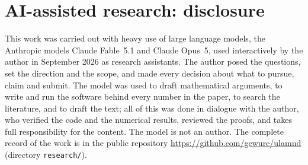 \documentclass[11pt,a4paper]{article}
\theoremstyle{remark}\newtheorem{remark}[theorem]{Remark}
\begin{document}
\section*{AI-assisted research: disclosure}
This work was carried out with heavy use of large language models, the Anthropic models Claude Fable~5.1 and
Claude Opus~5, used interactively by the author in September 2026 as research assistants. The author posed the questions, set the
direction and the scope, and made every decision about what to pursue, claim and submit. The model was used to draft
mathematical arguments, to write and run the software behind every number in the paper, to search the literature,
and to draft the text; all of this was done in dialogue with the author, who verified the code and the numerical
results, reviewed the proofs, and takes full responsibility for the content. The model is not an author. The
complete record of the work is in the public repository \url{https://github.com/gewure/ulamnd} (directory \texttt{research/}).



\end{document}
